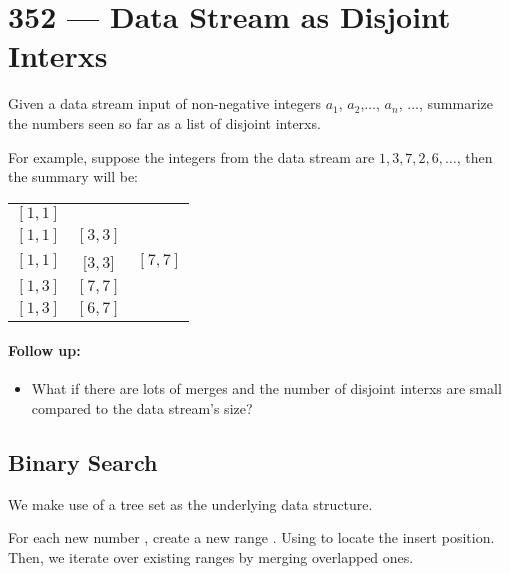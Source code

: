 \section{352 --- Data Stream as Disjoint Interxs}
Given a data stream input of non-negative integers $ a_1 $, $ a_2 $,$ \ldots$, $ a_n $, $ \ldots $, summarize the numbers seen so far as a list of disjoint interxs.
\par
For example, suppose the integers from the data stream are $ 1, 3, 7, 2, 6, \ldots $, then the summary will be:
\begin{tabular}{ccc}
$ [1, 1] $ & & \\
$ [1, 1] $ & $ [3, 3] $ & \\
$ [1, 1] $ & $ [3, 3 $] & $ [7, 7] $\\
$ [1, 3] $ & $ [7, 7] $  & \\
$ [1, 3] $ & $ [6, 7] $
\end{tabular}


\paragraph{Follow up:}
\begin{itemize}
\item What if there are lots of merges and the number of disjoint interxs are small compared to the data stream's size?
\end{itemize}

\subsection{Binary Search}
We make use of a tree set as the underlying data structure. 

For each new number , create a new range . Using  to locate the insert position. Then, we iterate over existing ranges by merging overlapped ones.


